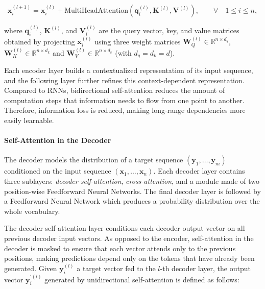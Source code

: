 \begin{equation}
    \bm{x}^{(l+1)}_i = \bm{x}^{(l)}_i + \textrm{MultiHeadAttention}\left(\bm{q}^{(l)}_i, \bm{K}^{(l)}, \bm{V}^{(l)}\right), \qquad \forall \quad 1 \leq i \leq n,
\end{equation}

\noindent where $\bm{q}^{(l)}_i$, $\bm{K}^{(l)}$, and $\bm{V}^{(l)}_i$ are the query vector, key, and value matrices obtained by projecting $\bm{x}^{(l)}_i$ using three weight matrices $\bm{W}^{(l)}_Q \in \mathbb{R}^{n \times d_q}$, $\bm{W}^{(l)}_K \in \mathbb{R}^{n \times d_k}$ and $\bm{W}^{(l)}_V \in \mathbb{R}^{n \times d_v}$ (with $d_q = d_k = d$).

Each encoder layer builds a contextualized representation of its input sequence, and the following layer further refines this context-dependent representation. Compared to \acp{RNN}, bidirectional self-attention reduces the amount of computation steps that information needs to flow from one point to another. Therefore, information loss is reduced, making long-range dependencies more easily learnable. 

\paragraph{Self-Attention in the Decoder} The decoder models the distribution of a target sequence $(\bm{y}_1, \ldots, \bm{y}_m)$ conditioned on the input sequence $(\bm{x}_1, \ldots, \bm{x}_n)$. Each decoder layer contains three sublayers: \textit{decoder self-attention}, \textit{cross-attention}, and a module made of two position-wise Feedforward Neural Networks. The final decoder layer is followed by a Feedforward Neural Network which produces a probability distribution over the whole vocabulary. 

The decoder self-attention layer conditions each decoder output vector on all previous decoder input vectors. As opposed to the encoder, self-attention in the decoder is masked to ensure that each vector attends only to the previous positions, making predictions depend only on the tokens that have already been generated. Given $\bm{y}^{(l)}_i$ a target vector fed to the $l$-th decoder layer, the output vector $\bm{y}^{\prime(l)}_i$ generated by unidirectional self-attention is defined as follows:

